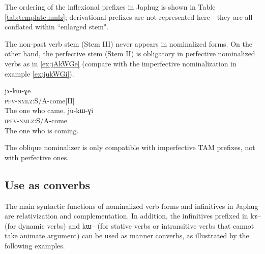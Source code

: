 \documentclass[oldfontcommands,oneside,a4paper,11pt]{article}
\newcommand{\ipa}[1]{{\phon \mbox{#1}}} %
\begin{document}
The ordering of the inflexional prefixes in  Japhug is shown in Table \ref{tab:template.nmlz}; derivational prefixes are not represented here - they are all conflated within   ``enlarged stem".



\begin{table}[H]
\caption{The template of nominalized verbal forms in Japhug} \centering \label{tab:template.nmlz}
\end{table}

The non-past verb stem (Stem III) never appears in nominalized forms. On the other hand, the perfective stem (Stem II) is obligatory in perfective nominalized verbs as in \ref{ex:jAkWGe} (compare with the imperfective nominalization in example \ref{ex:jukWGi}).

 \begin{exe}
\ex \label{ex:jAkWGe}
\gll
  	\ipa{jɤ-kɯ-ɣe}	   \\
  \textsc{pfv-nmlz:}S/A-come[II]   \\
\glt The one who came.
\ex \label{ex:jukWGi}
\gll
  	\ipa{ju-kɯ-ɣi}	   \\
  \textsc{ipfv-nmlz:}S/A-come   \\
\glt The one who is coming.
 \end{exe}
 
The oblique nominalizer is only compatible with imperfective TAM prefixes, not with perfective ones. 
 
 \subsection{Use as converbs} \label{sec:converb.kA}
 
 The main syntactic functions of nominalized verb forms and infinitives in Japhug are relativization and complementation.   In addition, the infinitives prefixed  in \ipa{kɤ--} (for dynamic verbs) and \ipa{kɯ--} (for stative verbs or intransitive verbs that cannot take animate argument) can be used as manner converbs, as illustrated by the following examples.
 
 
\end{document}
